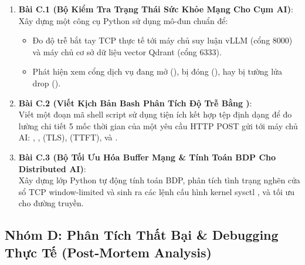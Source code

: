 \begin{enumerate}
  \item \textbf{Bài C.1 (Bộ Kiểm Tra Trạng Thái Sức Khỏe Mạng Cho Cụm AI)}: \\
  Xây dựng một công cụ Python  sử dụng mô-đun chuẩn  để:
  \begin{itemize}
    \item Đo độ trễ bắt tay TCP thực tế tới máy chủ suy luận vLLM (cổng 8000) và máy chủ cơ sở dữ liệu vector Qdrant (cổng 6333).
    \item Phát hiện xem cổng dịch vụ đang mở (), bị đóng (), hay bị tường lửa drop ().
  \end{itemize}

  \item \textbf{Bài C.2 (Viết Kịch Bản Bash Phân Tích Độ Trễ Bằng )}: \\
  Viết một đoạn mã shell script sử dụng tiện ích  kết hợp tệp định dạng  để đo lường chi tiết 5 mốc thời gian của một yêu cầu HTTP POST gửi tới máy chủ AI: , ,  (TLS),  (TTFT), và .

  \item \textbf{Bài C.3 (Bộ Tối Ưu Hóa Buffer Mạng \& Tính Toán BDP Cho Distributed AI)}: \\
  Xây dựng lớp Python  tự động tính toán BDP, phân tích tình trạng nghẽn cửa sổ TCP window-limited và sinh ra các lệnh cấu hình kernel sysctl ,  và  tối ưu cho đường truyền.
\end{enumerate}

\subsection{Nhóm D: Phân Tích Thất Bại \& Debugging Thực Tế (Post-Mortem Analysis)}

